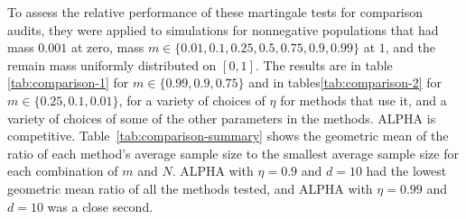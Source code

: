 \documentclass[12pt,runningheads]{llncs}
\begin{document}
{To assess the relative performance of these martingale tests for comparison audits, they were applied to
simulations for nonnegative populations that had mass $0.001$ at zero, mass $m \in \{0.01, 0.1, 0.25, 0.5, 0.75, 0.9, 0.99\}$
at $1$, and the remain mass uniformly distributed on $[0, 1]$.
The results are in table \ref{tab:comparison-1} for $m \in \{0.99, 0.9, 0.75\}$ and 
in tables\ref{tab:comparison-2} for $m \in \{0.25, 0.1, 0.01\}$,
for a variety of choices of $\eta$ for methods that use it, and a variety of choices of some of the other parameters
in the methods.
ALPHA is competitive.
Table~\ref{tab:comparison-summary} shows the geometric mean of the ratio of each method's average sample size
to the smallest average sample size for each combination of $m$ and $N$.
ALPHA with $\eta=0.9$ and $d=10$ had the lowest geometric mean ratio of all the methods tested,
and ALPHA with $\eta=0.99$ and $d=10$ was a close second.

}
\end{document}
